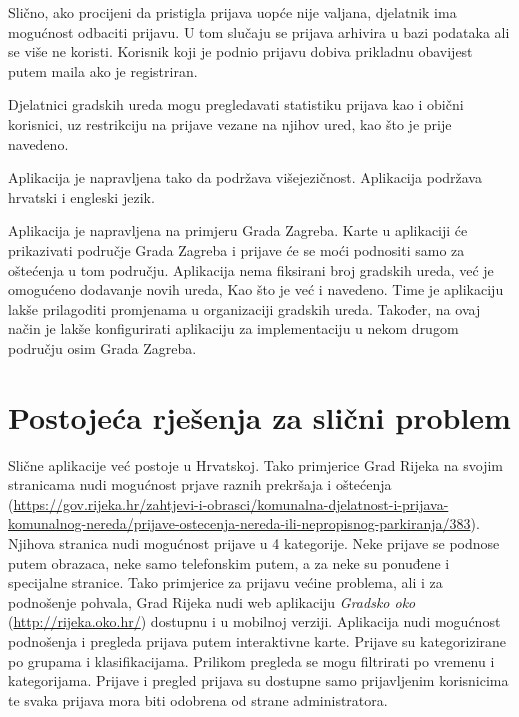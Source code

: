 		Slično, ako procijeni da pristigla prijava uopće nije valjana, djelatnik ima mogućnost odbaciti prijavu. U tom slučaju se prijava arhivira u bazi podataka ali se više ne koristi. Korisnik koji je podnio prijavu dobiva prikladnu obavijest putem maila ako je registriran.
		
		Djelatnici gradskih ureda mogu pregledavati statistiku prijava kao i obični korisnici, uz restrikciju na prijave vezane na njihov ured, kao što je prije navedeno.
		
		Aplikacija je napravljena tako da podržava višejezičnost. Aplikacija podržava hrvatski i engleski jezik.
		
		Aplikacija je napravljena na primjeru Grada Zagreba. Karte u aplikaciji će prikazivati područje Grada Zagreba i prijave će se moći podnositi samo za oštećenja u tom području. Aplikacija nema fiksirani broj gradskih ureda, već je omogućeno dodavanje novih ureda, Kao što je već i navedeno. Time je aplikaciju lakše prilagoditi promjenama u organizaciji gradskih ureda. Također, na ovaj način je lakše konfigurirati aplikaciju za implementaciju u nekom drugom području osim Grada Zagreba.
		\eject
		
		\section{Postojeća rješenja za slični problem}
		
			Slične aplikacije već postoje u Hrvatskoj. Tako primjerice Grad Rijeka na svojim stranicama nudi mogućnost prjave raznih prekršaja i oštećenja (\url{https://gov.rijeka.hr/zahtjevi-i-obrasci/komunalna-djelatnost-i-prijava-komunalnog-nereda/prijave-ostecenja-nereda-ili-nepropisnog-parkiranja/383}). Njihova stranica nudi mogućnost prijave u 4 kategorije. Neke prijave se podnose putem obrazaca, neke samo telefonskim putem, a za neke su ponuđene i specijalne stranice. Tako primjerice za prijavu većine problema, ali i za podnošenje pohvala, Grad Rijeka nudi web aplikaciju \textit{Gradsko oko} (\url{http://rijeka.oko.hr/}) dostupnu i u mobilnoj verziji. Aplikacija nudi mogućnost podnošenja i pregleda prijava putem interaktivne karte. Prijave su kategorizirane po grupama i klasifikacijama. Prilikom pregleda se mogu filtrirati po vremenu i kategorijama. Prijave i pregled prijava su dostupne samo prijavljenim korisnicima te svaka prijava mora biti odobrena od strane administratora.
		
